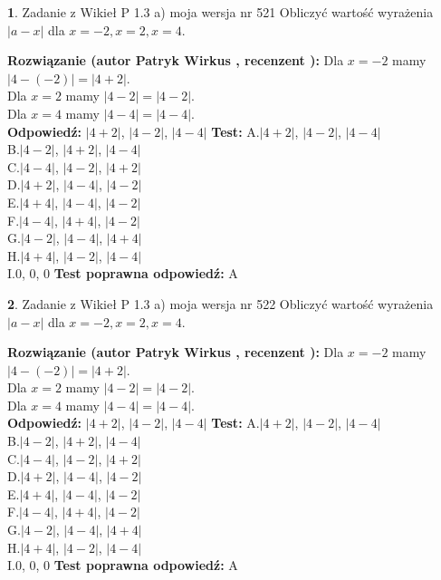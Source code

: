 \documentclass[12pt, a4paper]{article}
\theoremstyle{definition} %
\newtheorem{zad}{}
\newcommand{\zadStart}[1]{\begin{zad}#1\newline}
\newcommand{\zadStop}{\end{zad}}
\newcommand{\rozwStart}[2]{\noindent \textbf{Rozwiązanie (autor #1 , recenzent #2): }\newline}
\newcommand{\rozwStop}{\newline}
\newcommand{\odpStart}{\noindent \textbf{Odpowiedź:}\newline}
\newcommand{\odpStop}{\newline}
\newcommand{\testStart}{\noindent \textbf{Test:}\newline}
\newcommand{\testStop}{\newline}
\newcommand{\kluczStart}{\noindent \textbf{Test poprawna odpowiedź:}\newline}
\newcommand{\kluczStop}{\newline}
\begin{document}
\zadStart{Zadanie z Wikieł P 1.3 a) moja wersja nr 521}
Obliczyć wartość wyrażenia $|a - x|$ dla $x=-2,x=2,x=4$.
\zadStop
\rozwStart{Patryk Wirkus}{}
Dla $x = -2$ mamy $|4 - (-2)| = |4 + 2|$.\\
Dla $x = 2$ mamy $|4 - 2| = |4 - 2|$.\\
Dla $x = 4$ mamy $|4 - 4| = |4 - 4|$.\\
\rozwStop
\odpStart
$|4 + 2|$, $|4 - 2|$, $|4 - 4|$
\odpStop
\testStart
A.$|4 + 2|$, $|4 - 2|$, $|4 - 4|$\\
B.$|4 - 2|$, $|4 + 2|$, $|4 - 4|$\\
C.$|4 - 4|$, $|4 - 2|$, $|4 + 2|$\\
D.$|4 + 2|$, $|4 - 4|$, $|4 - 2|$\\
E.$|4 + 4|$, $|4 - 4|$, $|4 - 2|$\\
F.$|4 - 4|$, $|4 + 4|$, $|4 - 2|$\\
G.$|4 - 2|$, $|4 - 4|$, $|4 + 4|$\\
H.$|4 + 4|$, $|4 - 2|$, $|4 - 4|$\\
I.$0$, $0$, $0$
\testStop
\kluczStart
A
\kluczStop



\zadStart{Zadanie z Wikieł P 1.3 a) moja wersja nr 522}
Obliczyć wartość wyrażenia $|a - x|$ dla $x=-2,x=2,x=4$.
\zadStop
\rozwStart{Patryk Wirkus}{}
Dla $x = -2$ mamy $|4 - (-2)| = |4 + 2|$.\\
Dla $x = 2$ mamy $|4 - 2| = |4 - 2|$.\\
Dla $x = 4$ mamy $|4 - 4| = |4 - 4|$.\\
\rozwStop
\odpStart
$|4 + 2|$, $|4 - 2|$, $|4 - 4|$
\odpStop
\testStart
A.$|4 + 2|$, $|4 - 2|$, $|4 - 4|$\\
B.$|4 - 2|$, $|4 + 2|$, $|4 - 4|$\\
C.$|4 - 4|$, $|4 - 2|$, $|4 + 2|$\\
D.$|4 + 2|$, $|4 - 4|$, $|4 - 2|$\\
E.$|4 + 4|$, $|4 - 4|$, $|4 - 2|$\\
F.$|4 - 4|$, $|4 + 4|$, $|4 - 2|$\\
G.$|4 - 2|$, $|4 - 4|$, $|4 + 4|$\\
H.$|4 + 4|$, $|4 - 2|$, $|4 - 4|$\\
I.$0$, $0$, $0$
\testStop
\kluczStart
A
\kluczStop
\end{document}
